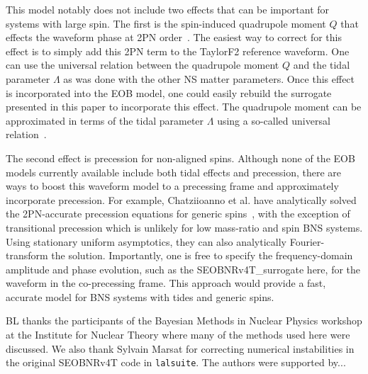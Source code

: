 \documentclass[prd,aps,letter,twocolumn,floatfix,notitlepage,nofootinbib]{revtex4-1}
\begin{document}
This model notably does not include two effects that can be important for systems with large spin. The first is the spin-induced quadrupole moment $Q$ that effects the waveform phase at 2PN order~\cite{Poisson1998}. The easiest way to correct for this effect is to simply add this 2PN term to the TaylorF2 reference waveform. One can use the universal relation between the quadrupole moment $Q$ and the tidal parameter $\Lambda$ as was done with the other NS matter parameters. Once this effect is incorporated into the EOB model, one could easily rebuild the surrogate presented in this paper to incorporate this effect. The quadrupole moment can be approximated in terms of the tidal parameter $\Lambda$ using a so-called universal relation~\cite{YagiYunes2013}.

The second effect is precession for non-aligned spins. Although none of the EOB models currently available include both tidal effects and precession, there are ways to boost this waveform model to a precessing frame and approximately incorporate precession. For example, Chatziioanno et al. have analytically solved the 2PN-accurate precession equations for generic spins~\cite{ChatziioannouKleinCornish2017a, ChatziioannouKleinCornish2017b}, with the exception of transitional precession which is unlikely for low mass-ratio and spin BNS systems. Using stationary uniform asymptotics, they can also analytically Fourier-transform the solution. Importantly, one is free to specify the frequency-domain amplitude and phase evolution, such as the SEOBNRv4T\_surrogate here, for the waveform in the co-precessing frame. This approach would provide a fast, accurate model for BNS systems with tides and generic spins.


\begin{acknowledgments}

BL thanks the participants of the Bayesian Methods in Nuclear Physics workshop at the Institute for Nuclear Theory where many of the methods used here were discussed. We also thank Sylvain Marsat for correcting numerical instabilities in the original SEOBNRv4T code in \texttt{lalsuite}. The authors were supported by... 

\end{acknowledgments}


%     
  
\end{document}
